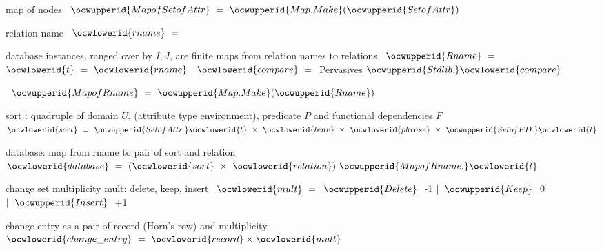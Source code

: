 \documentclass[12pt]{article}
\begin{document}
\ocwendcode{}\ocwindent{0.00em}
map of nodes 
\ocweol
\label{rellens_types.ml:3000}%
\medskip
\ocwbegincode{}\ocwindent{0.00em}
~$\ocwupperid{MapofSetofAttr}~=~\ocwupperid{Map.Make}(\ocwupperid{SetofAttr})$\medskip

\ocwendcode{}\ocwindent{0.00em}
relation name 
\ocweol
\label{rellens_types.ml:3065}%
\medskip
\ocwbegincode{}\ocwindent{0.00em}
~$\ocwlowerid{rname}~=~$\medskip

\ocwendcode{}\ocwindent{0.00em}
database instances, ranged over by $I,J$, are 
   finite maps from relation names to relations 
\ocweol
\label{rellens_types.ml:3188}%
\medskip
\ocwbegincode{}\ocwindent{0.00em}
~$\ocwupperid{Rname}~=~$\ocweol
\ocwindent{1.00em}
~$\ocwlowerid{t}~=~\ocwlowerid{rname}$\ocweol
\ocwindent{1.00em}
~$\ocwlowerid{compare}~=~$\ocwbc{} Pervasives \ocwec{}$\ocwupperid{Stdlib.}\ocwlowerid{compare}$\ocweol
\ocwindent{0.00em}
\medskip

\label{rellens_types.ml:3279}%
\ocwindent{0.00em}
~$\ocwupperid{MapofRname}~=~\ocwupperid{Map.Make}(\ocwupperid{Rname})$\medskip

\ocwendcode{}\ocwindent{0.00em}
sort : quadruple of domain $U$, (attribute type environment), predicate $P$ and functional dependencies $F$ 
\ocweol
\label{rellens_types.ml:3430}%
\medskip
\ocwbegincode{}\ocwindent{0.00em}
~$\ocwlowerid{sort}~=~\ocwupperid{SetofAttr.}\ocwlowerid{t}~\times{}~\ocwlowerid{tenv}~\times{}~\ocwlowerid{phrase}~\times{}~\ocwupperid{SetofFD.}\ocwlowerid{t}$\medskip

\ocwendcode{}\ocwindent{0.00em}
database: map from rname to pair of sort and relation 
\ocweol
\label{rellens_types.ml:3543}%
\medskip
\ocwbegincode{}\ocwindent{0.00em}
~$\ocwlowerid{database}~=~(\ocwlowerid{sort}~\times{}~\ocwlowerid{relation})~\ocwupperid{MapofRname.}\ocwlowerid{t}$\medskip

\ocwendcode{}\ocwindent{0.00em}
change set 
\ocweol
\ocwindent{0.00em}
multiplicity mult: delete, keep, insert 
\ocweol
\label{rellens_types.ml:3654}%
\medskip
\ocwbegincode{}\ocwindent{0.00em}
~$\ocwlowerid{mult}~=~$\ocweol
\ocwindent{2.00em}
$\ocwupperid{Delete}~$\ocwbc{} -1 \ocwec{}\ocweol
\ocwindent{1.00em}
$\mid{}~\ocwupperid{Keep}~$\ocwbc{}  0 \ocwec{}\ocweol
\ocwindent{1.00em}
$\mid{}~\ocwupperid{Insert}~$\ocwbc{} +1 \ocwec{}\medskip

\ocwendcode{}\ocwindent{0.00em}
change entry as a pair of record (Horn's row) and multiplicity 
\ocweol
\label{rellens_types.ml:3800}%
\medskip
\ocwbegincode{}\ocwindent{0.00em}
~$\ocwlowerid{change\_entry}~=~\ocwlowerid{record}\times{}\ocwlowerid{mult}$\medskip
\end{document}
